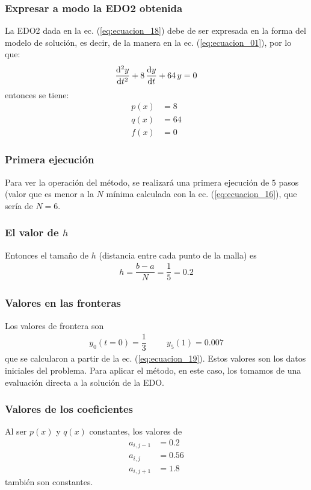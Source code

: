 \begin{frame}
\frametitle{Expresar a modo la EDO2 obtenida}
La EDO2 dada en la ec. (\ref{eq:ecuacion_18}) debe de ser expresada en la forma del modelo de solución, es decir, de la manera en la ec. (\ref{eq:ecuacion_01}), por lo que:
\begin{align}
\dv[2]{y}{t} + 8 \, \dv{y}{t} + 64 \, y = 0
\label{eq:ecuacion_20}
\end{align}
entonces se tiene:
\begin{align}
p(x) &= 8 \label{eq:ecuacion_21} \\
q(x) &= 64 \label{eq:ecuacion_22} \\
f(x) &= 0 \label{eq:ecuacion_23}
\end{align}
\end{frame}
\begin{frame}
\frametitle{Primera ejecución}
Para ver la operación del método, se realizará una primera ejecución de $5$ pasos (valor que es menor a la $N$ mínima calculada con la ec. (\ref{eq:ecuacion_16}), que sería de $N = 6$.
\end{frame}
\begin{frame}
\frametitle{El valor de $h$}
Entonces el tamaño de $h$ (distancia entre cada punto de la malla) es
\begin{align*}
h = \dfrac{b - a}{N} = \dfrac{1}{5} = 0.2
\end{align*}
\end{frame}
\begin{frame}
\frametitle{Valores en las fronteras}
Los valores de frontera son
\begin{align*}
y_{0} (t=0) = \dfrac{1}{3} \hspace{1cm} y_{5}(1) = 0.007
\end{align*}
que se calcularon a partir de la ec. (\ref{eq:ecuacion_19}). Estos valores son los datos iniciales del problema. Para aplicar el método, en este caso, los tomamos de una evaluación directa a la solución de la EDO.
\end{frame}
\begin{frame}
\frametitle{Valores de los coeficientes}
Al ser $p(x)$ y $q(x)$ constantes, los valores de
\begin{align*}
a_{i,j-1} &= 0.2 \\[0.25em]
a_{i,j} &= 0.56 \\[0.25em]
a_{i,j+1} &= 1.8
\end{align*}
también son constantes.
\end{frame}
